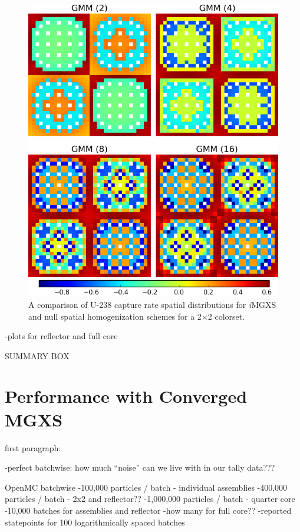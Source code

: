 \begin{figure}[h!]
\centering
\includegraphics[width=0.9\linewidth]{figures/results/compare/2x2/compare-capt}
\vspace{2mm}
\caption[U-238 capture rate comparison for a 2$\times$2 colorset]{A comparison of U-238 capture rate spatial distributions for \textit{i}\ac{MGXS} and null spatial homogenization schemes for a 2$\times$2 colorset.}
\label{fig:chap11-assm-2x2-capt-rates}
\end{figure}

\clearpage

-plots for reflector and full core

SUMMARY BOX


\section{Performance with Converged MGXS}
\label{sec:chap11-improvements}

first paragraph:

-perfect batchwise: how much ``noise'' can we live with in our tally data???

OpenMC batchwise
-100,000 particles / batch - individual assemblies
-400,000 particles / batch - 2x2 and reflector??
-1,000,000 particles / batch - quarter core
-10,000 batches for assemblies and reflector
-how many for full core??
-reported statepoints for 100 logarithmically spaced batches


